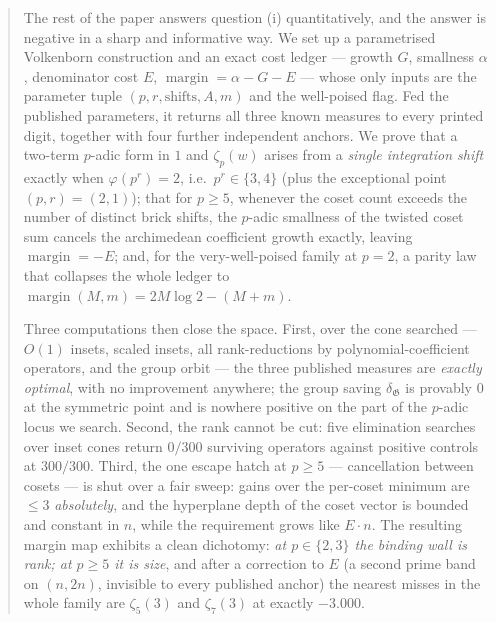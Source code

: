 \documentclass[11pt,reqno]{amsart}
\theoremstyle{plain}
\theoremstyle{definition}
\numberwithin{equation}{section}
\newcommand{\Gp}{\mathfrak{G}}
\newcommand{\marg}{\operatorname{margin}}
\newcommand{\dgr}{\delta_{\Gp}}
\begin{document}
\begin{abstract}
The rest of the paper answers question (i) quantitatively, and the answer is negative in a
sharp and informative way. We set up a parametrised Volkenborn construction and an exact
cost ledger --- growth $G$, smallness $\alpha$, denominator cost $E$, $\marg=\alpha-G-E$ ---
whose only inputs are the parameter tuple $(p,r,\text{shifts},A,m)$ and the well-poised flag.
Fed the published parameters, it returns all three known measures to every printed digit,
together with four further independent anchors. We prove that a two-term $p$-adic form in
$1$ and $\zeta_p(w)$ arises from a \emph{single integration shift} exactly when
$\varphi(p^r)=2$, i.e.\ $p^r\in\{3,4\}$ (plus the
exceptional point $(p,r)=(2,1)$); that for $p\ge5$, whenever the coset count exceeds the
number of distinct brick shifts, the $p$-adic smallness of the twisted
coset sum cancels the archimedean coefficient growth exactly, leaving $\marg=-E$; and, for
the very-well-poised family at $p=2$, a parity law that collapses the whole ledger to
$\marg(M,m)=2M\log2-(M+m)$.

Three computations then close the space. First, over the cone searched --- $O(1)$ insets,
scaled insets, all rank-reductions by polynomial-coefficient operators, and the group orbit
--- the three published measures are \emph{exactly optimal}, with no improvement anywhere; the
group saving $\dgr$ is provably $0$ at the symmetric point and is nowhere positive on the
part of the $p$-adic locus we search. Second, the rank cannot be cut: five elimination searches over inset
cones return $0/300$ surviving operators against positive controls at $300/300$. Third, the one escape hatch at $p\ge5$ --- cancellation
between cosets --- is shut over a fair sweep: gains over the per-coset minimum are $\le3$
\emph{absolutely}, and the hyperplane depth of the coset vector is bounded and constant in
$n$, while the requirement grows like $E\cdot n$. The resulting margin map exhibits a clean
dichotomy: \emph{at $p\in\{2,3\}$ the binding wall is rank; at $p\ge5$ it is size}, and after
a correction to $E$ (a second prime band on $(n,2n)$, invisible to every published anchor)
the nearest misses in the whole family are $\zeta_5(3)$ and $\zeta_7(3)$ at exactly $-3.000$.


\end{abstract}
\end{document}
